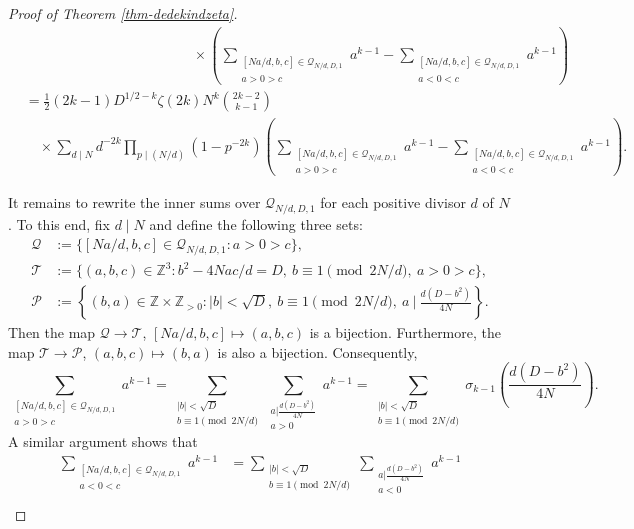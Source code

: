 \documentclass[12pt]{amsart}
\numberwithin{equation}{section}
\theoremstyle{definition}
\begin{document}
\begin{proof}[Proof of Theorem \ref{thm-dedekindzeta}]
\begin{align*}
    &\qquad\qquad\qquad\qquad\qquad\qquad\times\left(\sum\limits_{\substack{[Na/d,b,c]\in\mathcal{Q}_{N/d,D,1} \\ a>0>c}}a^{k-1}-\sum\limits_{\substack{[Na/d,b,c]\in\mathcal{Q}_{N/d,D,1} \\ a<0<c}}a^{k-1}\right)\\
    &=\frac{1}{2}(2k-1)D^{1/2-k}\zeta(2k)N^{k}\binom{2k-2}{k-1}\\
    &\quad\times\sum_{d\mid N}d^{-2k}\prod_{p\mid(N/d)}(1-p^{-2k})\left(\sum\limits_{\substack{[Na/d,b,c]\in\mathcal{Q}_{N/d,D,1} \\ a>0>c}}a^{k-1}-\sum\limits_{\substack{[Na/d,b,c]\in\mathcal{Q}_{N/d,D,1} \\ a<0<c}}a^{k-1}\right).
\end{align*}

It remains to rewrite the inner sums over $\mathcal{Q}_{N/d,D,1}$ for each positive divisor $d$ of $N$. To this end, fix $d\mid N$ and define the following three sets:
\begin{align*}
    \mathcal{Q}&:=\{[Na/d,b,c]\in\mathcal{Q}_{N/d,D,1}:a>0>c\},\\
    \mathcal{T}&:=\{(a,b,c)\in\mathbb{Z}^{3}:b^{2}-4Nac/d=D,~b\equiv 1\pmod{2N/d},~a>0>c\},\\
    \mathcal{P}&:=\left\{(b,a)\in\mathbb{Z}\times\mathbb{Z}_{>0}:|b|<\sqrt{D},~b\equiv 1\pmod{2N/d},~a~\bigg|~\frac{d(D-b^{2})}{4N}\right\}.
\end{align*}
Then the map $\mathcal{Q}\rightarrow\mathcal{T}$, $[Na/d,b,c]\mapsto(a,b,c)$ is a bijection. Furthermore, the map
$\mathcal{T}\rightarrow\mathcal{P}$, $(a,b,c)\mapsto (b,a)$ is also a bijection. Consequently,
\[
\sum\limits_{\substack{[Na/d,b,c]\in\mathcal{Q}_{N/d,D,1} \\ a>0>c}}a^{k-1}
=\sum\limits_{\substack{|b|<\sqrt{D} \\ b\equiv 1\pmod{2N/d}}}\sum\limits_{\substack{a \big| \frac{d(D-b^{2})}{4N} \\ a>0}}a^{k-1}
=\sum\limits_{\substack{|b|<\sqrt{D} \\ b\equiv 1\pmod{2N/d}}}\sigma_{k-1}\left(\frac{d(D-b^{2})}{4N}\right).
\]
A similar argument shows that
\begin{align*}
    \sum\limits_{\substack{[Na/d,b,c]\in\mathcal{Q}_{N/d,D,1} \\ a<0<c}}a^{k-1}
    &=\sum\limits_{\substack{|b|<\sqrt{D} \\ b\equiv 1\pmod{2N/d}}}\sum\limits_{\substack{a \big| \frac{d(D-b^{2})}{4N} \\ a<0}}a^{k-1}\\

\end{align*}
\end{proof}
\end{document}
